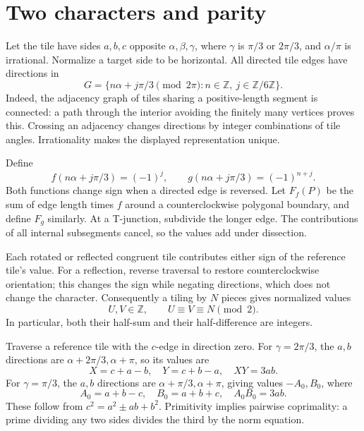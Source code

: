 \documentclass[11pt]{article}
\newcommand{\Z}{\mathbb Z}
\begin{document}
\section{Two characters and parity}
Let the tile have sides $a,b,c$ opposite $\alpha,\beta,\gamma$, where $\gamma$ is $\pi/3$ or $2\pi/3$, and $\alpha/\pi$ is irrational. Normalize a target side to be horizontal. All directed tile edges have directions in
\[
G=\{n\alpha+j\pi/3\pmod{2\pi}:n\in\Z,\ j\in\Z/6\Z\}.
\]
Indeed, the adjacency graph of tiles sharing a positive-length segment is connected: a path through the interior avoiding the finitely many vertices proves this. Crossing an adjacency changes directions by integer combinations of tile angles. Irrationality makes the displayed representation unique.

Define
\[
f(n\alpha+j\pi/3)=(-1)^j,\qquad
g(n\alpha+j\pi/3)=(-1)^{n+j}.
\]
Both functions change sign when a directed edge is reversed. Let $F_f(P)$ be the sum of edge length times $f$ around a counterclockwise polygonal boundary, and define $F_g$ similarly. At a T-junction, subdivide the longer edge. The contributions of all internal subsegments cancel, so the values add under dissection.

Each rotated or reflected congruent tile contributes either sign of the reference tile's value. For a reflection, reverse traversal to restore counterclockwise orientation; this changes the sign while negating directions, which does not change the character. Consequently a tiling by $N$ pieces gives normalized values
\begin{equation}
 U,V\in\Z,\qquad U\equiv V\equiv N\pmod2. \label{eq:parity}
\end{equation}
In particular, both their half-sum and their half-difference are integers.

Traverse a reference tile with the $c$-edge in direction zero. For $\gamma=2\pi/3$, the $a,b$ directions are $\alpha+2\pi/3,\alpha+\pi$, so its values are
\begin{equation}
 X=c+a-b,\quad Y=c+b-a,\quad XY=3ab. \label{eq:120}
\end{equation}
For $\gamma=\pi/3$, the $a,b$ directions are $\alpha+\pi/3,\alpha+\pi$, giving values $-A_0,B_0$, where
\begin{equation}
 A_0=a+b-c,\quad B_0=a+b+c,\quad A_0B_0=3ab. \label{eq:60}
\end{equation}
These follow from $c^2=a^2\pm ab+b^2$. Primitivity implies pairwise coprimality: a prime dividing any two sides divides the third by the norm equation.
\end{document}
